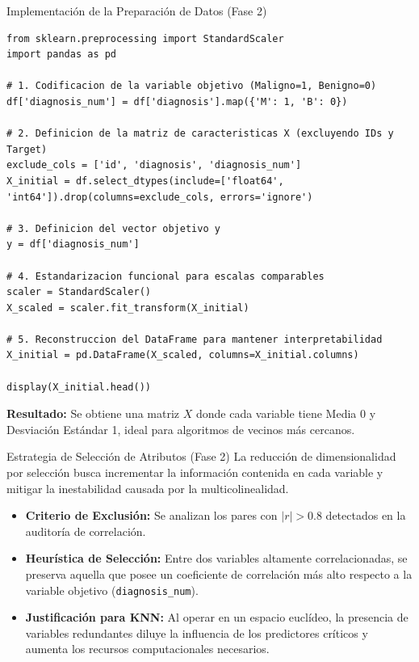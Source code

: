 \documentclass{beamer}
\begin{document}
	\begin{frame}[fragile]{Implementación de la Preparación de Datos (Fase 2)}
		\onslide<2->\begin{lstlisting}[style=colab]
from sklearn.preprocessing import StandardScaler
import pandas as pd

# 1. Codificacion de la variable objetivo (Maligno=1, Benigno=0)
df['diagnosis_num'] = df['diagnosis'].map({'M': 1, 'B': 0})

# 2. Definicion de la matriz de caracteristicas X (excluyendo IDs y Target)
exclude_cols = ['id', 'diagnosis', 'diagnosis_num']
X_initial = df.select_dtypes(include=['float64', 'int64']).drop(columns=exclude_cols, errors='ignore')

# 3. Definicion del vector objetivo y
y = df['diagnosis_num']

# 4. Estandarizacion funcional para escalas comparables
scaler = StandardScaler()
X_scaled = scaler.fit_transform(X_initial)

# 5. Reconstruccion del DataFrame para mantener interpretabilidad
X_initial = pd.DataFrame(X_scaled, columns=X_initial.columns)

display(X_initial.head())
		\end{lstlisting}
		\textbf{Resultado:} Se obtiene una matriz $X$ donde cada variable tiene Media 0 y Desviación Estándar 1, ideal para algoritmos de vecinos más cercanos.
	\end{frame}
	
	
	\begin{frame}{Estrategia de Selección de Atributos (Fase 2)}
		La reducción de dimensionalidad por selección busca incrementar la información contenida en cada variable y mitigar la inestabilidad causada por la multicolinealidad.
		
		\begin{itemize}
			\item<2-> \textbf{Criterio de Exclusión:} Se analizan los pares con $|r| > 0.8$ detectados en la auditoría de correlación.
			\item<3-> \textbf{Heurística de Selección:} Entre dos variables altamente correlacionadas, se preserva aquella que posee un coeficiente de correlación más alto respecto a la variable objetivo (\texttt{diagnosis\_num}).
			\item<4-> \textbf{Justificación para KNN:} Al operar en un espacio euclídeo, la presencia de variables redundantes diluye la influencia de los predictores críticos y aumenta los recursos computacionales necesarios.
		\end{itemize}
	\end{frame}
	
\end{document}
